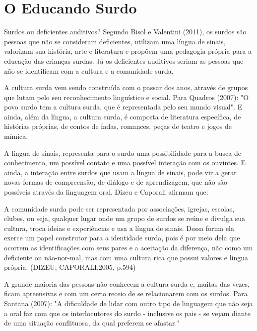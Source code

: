 \documentclass[brasil]{abnt}
\begin{document}
\chapter{O Educando Surdo}
		Surdos ou deficientes auditivos? Segundo Bisol e Valentini (2011), os surdos são pessoas que não se consideram deficientes, utilizam uma língua de sinais, valorizam sua história, arte e literatura 
		e propõem uma pedagogia própria para a educação das crianças surdas. Já os deficientes auditivos seriam as pessoas que não se identificam com a cultura e a comunidade surda. 
				
		A cultura surda vem sendo construída com o passar dos anos, através de grupos que lutam pelo seu reconhecimento linguístico e social. 
		Para Quadros (2007): "O povo surdo tem a cultura surda, que é representada pelo seu mundo visual". E ainda, além da língua, a cultura surda, é composta de literatura 
		específica, de histórias próprias, de contos de fadas, romances, peças de teatro e jogos de mímica.
		
		
		A língua de sinais, representa para o surdo uma possibilidade para a busca de conhecimento, um possível contato e uma possível interação com os ouvintes.
		E ainda, a interação entre surdos que usam a língua de sinais, pode vir a gerar novas formas de compreensão, de diálogo e de aprendizagem, que não são possíveis através da linguagem oral.
		Dizeu e Caporali afirmam que:
		
			\begin{citacao}A comunidade surda pode ser representada por associações, igrejas, escolas, clubes, ou seja, qualquer lugar onde um grupo de surdos se reúne e divulga sua cultura, troca ideias e 
							experiências e usa a língua de sinais. Dessa forma ela exerce um papel construtor para a identidade surda, pois é por meio dela que ocorrem as identificações com seus pares e a 
							aceitação da diferença, não como um deficiente ou não-nor-mal, mas com uma cultura rica que possui valores e língua própria. (DIZEU; CAPORALI,2005, p.594)
			\end{citacao}
			
		A grande maioria das pessoas não conhecem a cultura surda e, muitas das vezes, ficam apreensivas e com um certo receio de se relacionarem com os surdos. Para Santana (2007): "A dificuldade de lidar 
		com outro tipo de linguagem que não seja a oral faz com que os interlocutores do surdo - inclusive os pais - se vejam diante de uma situação conflituosa, da qual preferem se afastar."		
		
\end{document}
